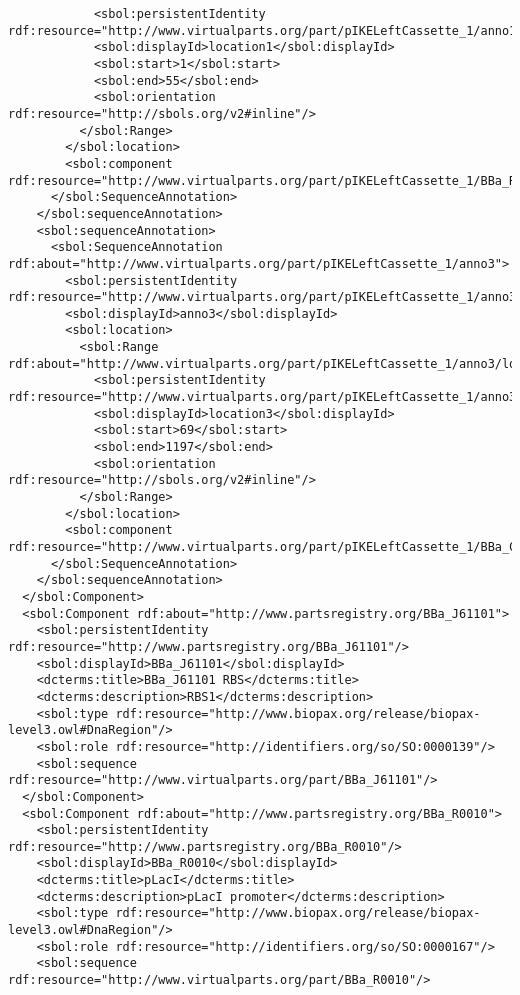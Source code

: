 \begin{lstlisting}
            <sbol:persistentIdentity rdf:resource="http://www.virtualparts.org/part/pIKELeftCassette_1/anno1/location1"/>
            <sbol:displayId>location1</sbol:displayId>
            <sbol:start>1</sbol:start>
            <sbol:end>55</sbol:end>
            <sbol:orientation rdf:resource="http://sbols.org/v2#inline"/>
          </sbol:Range>
        </sbol:location>
        <sbol:component rdf:resource="http://www.virtualparts.org/part/pIKELeftCassette_1/BBa_R0040"/>
      </sbol:SequenceAnnotation>
    </sbol:sequenceAnnotation>
    <sbol:sequenceAnnotation>
      <sbol:SequenceAnnotation rdf:about="http://www.virtualparts.org/part/pIKELeftCassette_1/anno3">
        <sbol:persistentIdentity rdf:resource="http://www.virtualparts.org/part/pIKELeftCassette_1/anno3"/>
        <sbol:displayId>anno3</sbol:displayId>
        <sbol:location>
          <sbol:Range rdf:about="http://www.virtualparts.org/part/pIKELeftCassette_1/anno3/location3">
            <sbol:persistentIdentity rdf:resource="http://www.virtualparts.org/part/pIKELeftCassette_1/anno3/location3"/>
            <sbol:displayId>location3</sbol:displayId>
            <sbol:start>69</sbol:start>
            <sbol:end>1197</sbol:end>
            <sbol:orientation rdf:resource="http://sbols.org/v2#inline"/>
          </sbol:Range>
        </sbol:location>
        <sbol:component rdf:resource="http://www.virtualparts.org/part/pIKELeftCassette_1/BBa_C0012"/>
      </sbol:SequenceAnnotation>
    </sbol:sequenceAnnotation>
  </sbol:Component>
  <sbol:Component rdf:about="http://www.partsregistry.org/BBa_J61101">
    <sbol:persistentIdentity rdf:resource="http://www.partsregistry.org/BBa_J61101"/>
    <sbol:displayId>BBa_J61101</sbol:displayId>
    <dcterms:title>BBa_J61101 RBS</dcterms:title>
    <dcterms:description>RBS1</dcterms:description>
    <sbol:type rdf:resource="http://www.biopax.org/release/biopax-level3.owl#DnaRegion"/>
    <sbol:role rdf:resource="http://identifiers.org/so/SO:0000139"/>
    <sbol:sequence rdf:resource="http://www.virtualparts.org/part/BBa_J61101"/>
  </sbol:Component>
  <sbol:Component rdf:about="http://www.partsregistry.org/BBa_R0010">
    <sbol:persistentIdentity rdf:resource="http://www.partsregistry.org/BBa_R0010"/>
    <sbol:displayId>BBa_R0010</sbol:displayId>
    <dcterms:title>pLacI</dcterms:title>
    <dcterms:description>pLacI promoter</dcterms:description>
    <sbol:type rdf:resource="http://www.biopax.org/release/biopax-level3.owl#DnaRegion"/>
    <sbol:role rdf:resource="http://identifiers.org/so/SO:0000167"/>
    <sbol:sequence rdf:resource="http://www.virtualparts.org/part/BBa_R0010"/>

\end{lstlisting}
